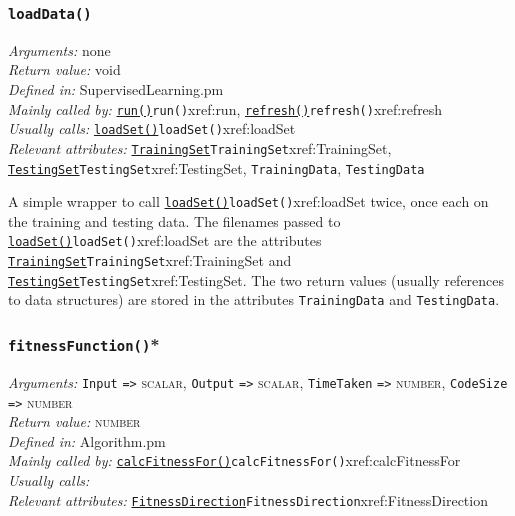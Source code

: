 \documentclass[a4paper]{article}
\begin{document}
\subsubsection{\texttt{loadData()}}\label{xref:loadData}
\begin{flushleft}
\textit{Arguments:} none\\
\textit{Return value:} void\\
\textit{Defined in:} SupervisedLearning.pm\\
\textit{Mainly called by:} \hyperref[no]{\texttt{run()}}{\texttt{run()}}{xref:run}, \hyperref[no]{\texttt{refresh()}}{\texttt{refresh()}}{xref:refresh}\\
\textit{Usually calls:} \hyperref[no]{\texttt{loadSet()}}{\texttt{loadSet()}}{xref:loadSet}\\
\textit{Relevant attributes:} \hyperref[no]{\texttt{TrainingSet}}{\texttt{TrainingSet}}{xref:TrainingSet}, \hyperref[no]{\texttt{TestingSet}}{\texttt{TestingSet}}{xref:TestingSet}, \texttt{TrainingData}, \texttt{TestingData}
\end{flushleft}


A simple wrapper to call \hyperref[no]{\texttt{loadSet()}}{\texttt{loadSet()}}{xref:loadSet} twice, once each on the
training and testing data.  The filenames passed to \hyperref[no]{\texttt{loadSet()}}{\texttt{loadSet()}}{xref:loadSet}
are the attributes \hyperref[no]{\texttt{TrainingSet}}{\texttt{TrainingSet}}{xref:TrainingSet} and \hyperref[no]{\texttt{TestingSet}}{\texttt{TestingSet}}{xref:TestingSet}.  The
two return values (usually references to data structures) are stored
in the attributes \texttt{TrainingData} and \texttt{TestingData}.


\subsubsection{\texttt{fitnessFunction()}*}\label{xref:fitnessFunction}
\begin{flushleft}
\textit{Arguments:} \texttt{Input} \verb:=>: \textsc{scalar}, \texttt{Output} \verb:=>: \textsc{scalar}, \texttt{TimeTaken} \verb:=>: \textsc{number}, \texttt{CodeSize} \verb:=>: \textsc{number}\\
\textit{Return value:} \textsc{number}\\
\textit{Defined in:} Algorithm.pm\\
\textit{Mainly called by:} \hyperref[no]{\texttt{calcFitnessFor()}}{\texttt{calcFitnessFor()}}{xref:calcFitnessFor} \\
\textit{Usually calls:} \\
\textit{Relevant attributes:} \hyperref[no]{\texttt{FitnessDirection}}{\texttt{FitnessDirection}}{xref:FitnessDirection}
\end{flushleft}
\end{document}
